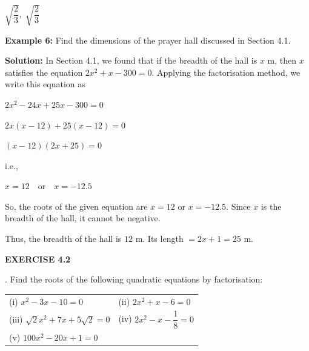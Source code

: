 \documentclass[11pt]{article}
\begin{document}
\begin{center}
$\sqrt{\dfrac{2}{3}}, \; \sqrt{\dfrac{2}{3}}$
\end{center}

\noindent\textcolor{chapterblue}{\textbf{Example 6:}} Find the dimensions of the prayer hall discussed in Section 4.1.

\medskip

\noindent\textcolor{chapterblue}{\textbf{Solution:}}
In Section 4.1, we found that if the breadth of the hall is $x$ m, then $x$ satisfies the equation $2x^2 + x - 300 = 0$. Applying the factorisation method, we write this equation as

\begin{center}
$2x^2 - 24x + 25x - 300 = 0$
\end{center}

\begin{center}
$2x(x - 12) + 25(x - 12) = 0$
\end{center}

\begin{center}
$(x - 12)(2x + 25) = 0$
\end{center}

i.e.,

\begin{center}
$x = 12 \quad \text{or} \quad x = -12.5$
\end{center}

\noindent So, the roots of the given equation are $x = 12$ or $x = -12.5$. Since $x$ is the
breadth of the hall, it cannot be negative.

\noindent Thus, the breadth of the hall is $12$ m. Its length $= 2x + 1 = 25$ m.
\begin{center}
\textcolor{chapterblue}{\Large\textbf{EXERCISE 4.2}}
\end{center}
\medskip

. Find the roots of the following quadratic equations by factorisation:

\begin{tabular}{@{}p{} p{}@{}}
(i) $x^2 - 3x - 10 = 0$ 
& 
(ii) $2x^2 + x - 6 = 0$ \\[6pt]

(iii) $\sqrt{2}x^2 + 7x + 5\sqrt{2} = 0$ 
& 
(iv) $2x^2 - x - \dfrac{1}{8} = 0$ \\[6pt]

(v) $100x^2 - 20x + 1 = 0$ 
&
\end{tabular}

\medskip
\end{document}
